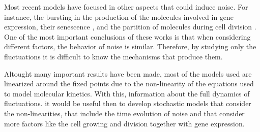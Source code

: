 Most recent models have focused in other aspects that could induce noise. For instance, the bursting in the production of the molecules involved in gene expression, their senescence \cite{pedraza08}, and the partition of molecules during cell division \cite{huh11a} \cite{huh11b}. One of the most important conclusions of these works is that when considering different factors, the behavior of noise is similar. Therefore, by studying only the fluctuations it is difficult to know the mechanisms that produce them.

Altought many important results have been made, most of the models used are linearized around the fixed points due to the non-linearity of the equations used to model molecular kinetics. With this, information about the full dynamics of fluctuations. it would be useful then to develop stochastic models that consider the non-linearities, that include the time evolution of noise and that consider more factors like the cell growing and division together with gene expression.
